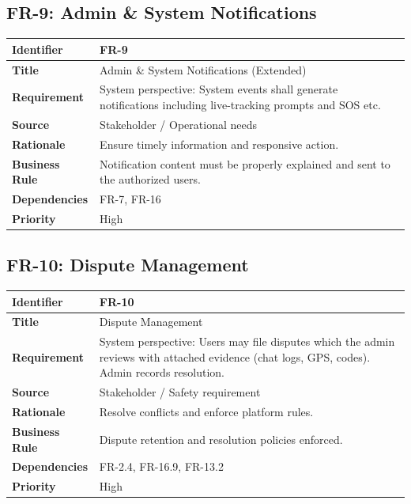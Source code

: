 \subsection{FR-9: Admin \& System Notifications}

\begin{longtable}{|p{3cm}|p{12cm}|}
\hline
\rowcolor{lightgray!30}
\textbf{Identifier} & FR-9 \\
\hline
\textbf{Title} & Admin \& System Notifications (Extended) \\
\hline
\textbf{Requirement} & System perspective: System events shall generate notifications including live-tracking prompts and SOS etc. \\
\hline
\textbf{Source} & Stakeholder / Operational needs \\
\hline
\textbf{Rationale} & Ensure timely information and responsive action. \\
\hline
\textbf{Business Rule} & Notification content must be properly explained and sent to the authorized users. \\
\hline
\textbf{Dependencies} & FR-7, FR-16 \\
\hline
\textbf{Priority} & High \\
\hline
\end{longtable}

\subsection{FR-10: Dispute Management}

\begin{longtable}{|p{3cm}|p{12cm}|}
\hline
\rowcolor{lightgray!30}
\textbf{Identifier} & FR-10 \\
\hline
\textbf{Title} & Dispute Management \\
\hline
\textbf{Requirement} & System perspective: Users may file disputes which the admin reviews with attached evidence (chat logs, GPS, codes). Admin records resolution. \\
\hline
\textbf{Source} & Stakeholder / Safety requirement \\
\hline
\textbf{Rationale} & Resolve conflicts and enforce platform rules. \\
\hline
\textbf{Business Rule} & Dispute retention and resolution policies enforced. \\
\hline
\textbf{Dependencies} & FR-2.4, FR-16.9, FR-13.2 \\
\hline
\textbf{Priority} & High \\
\hline
\end{longtable}

